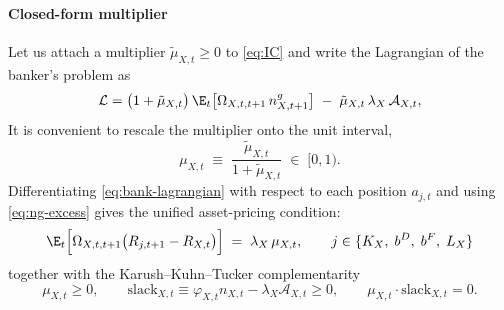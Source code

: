 \paragraph{Closed-form multiplier}

Let us attach a multiplier $\tilde\mu_{X,t}\ge0$ to \eqref{eq:IC} and write the Lagrangian of the banker's problem as
\begin{equation}
\mathcal{L}
=\bigl(1+\tilde\mu_{X,t}\bigr)\,
  \E_t\bigl[\Omega_{X,t,t+1}\,n^{g}_{X,t+1}\bigr]
  \;-\;\tilde\mu_{X,t}\,\lambda_X\,\mathcal{A}_{X,t},
\label{eq:bank-lagrangian}
\end{equation}
It is convenient to rescale the multiplier onto the unit interval,
\begin{equation}
\mu_{X,t}\;\equiv\;\frac{\tilde\mu_{X,t}}{1+\tilde\mu_{X,t}}\;\in\;[0,1).
\label{eq:mu-rescale}
\end{equation}
Differentiating \eqref{eq:bank-lagrangian} with respect to each position $a_{j,t}$
and using \eqref{eq:ng-excess} gives the unified asset-pricing condition: 
\begin{equation}
\;\E_t\Bigl[\Omega_{X,t,t+1}\bigl(R_{j,t+1}-R_{X,t}\bigr)\Bigr]
\;=\;\lambda_X\,\mu_{X,t},
\qquad j\in\{K_X,\;b^{D},\;b^{F},\;L_X\}\;
\label{eq:foc-general}
\end{equation}
together with the Karush--Kuhn--Tucker complementarity
\begin{equation}
\mu_{X,t}\ge0,
\qquad
\mathrm{slack}_{X,t}\equiv\varphi_{X,t}n_{X,t}-\lambda_X\mathcal{A}_{X,t}\ge0,
\qquad
\mu_{X,t}\cdot\mathrm{slack}_{X,t}=0 .
\label{eq:kkt}
\end{equation}

